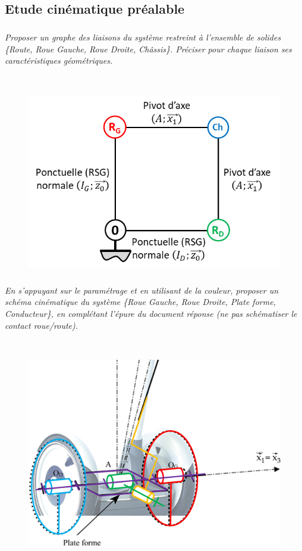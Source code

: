 \documentclass[10pt,fleqn]{article} %
\begin{document}
\subsection{Etude cinématique préalable}
\subparagraph{\label{q_05}}\textit{Proposer un graphe des liaisons du système restreint à l’ensemble de solides \{Route, Roue Gauche, Roue Droite, Châssis\}. Préciser pour chaque liaison ses caractéristiques géométriques.}
\ifprof
\begin{corrige}~\\
\begin{figure}[H]
\centering
\includegraphics[width=0.45\linewidth]{cor_02}
\end{figure}
\end{corrige}
\else
\fi

\subparagraph{\label{q_06}}\textit{En s’appuyant sur le paramétrage et en utilisant de la couleur, proposer un schéma cinématique du système \{Roue Gauche, Roue Droite, Plate forme, Conducteur\}, en complétant l’épure du document réponse (ne pas schématiser le contact roue/route).}
\ifprof
\begin{corrige} ~\\
\begin{figure}[H]
\centering
\includegraphics[width=0.6\linewidth]{cor_03}
\end{figure}
\end{corrige}
\else
\fi
\end{document}
